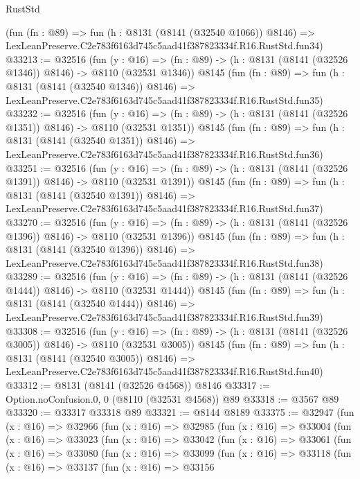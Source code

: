 \begin{lexlean}{RustStd}
\begin{coremodule}
    (fun (fn : @89) =>
    fun (h : @8131 (@8141 (@32540 @1066)) @8146) =>
    LexLeanPreserve.C2e783f6163d745c5aad41f387823334f.R16.RustStd.fun34)
@33213 := @32516
    (fun (y : @16) =>
    (fn : @89) -> (h : @8131 (@8141 (@32526 @1346)) @8146) -> @8110 (@32531 @1346))
    @8145
    (fun (fn : @89) =>
    fun (h : @8131 (@8141 (@32540 @1346)) @8146) =>
    LexLeanPreserve.C2e783f6163d745c5aad41f387823334f.R16.RustStd.fun35)
@33232 := @32516
    (fun (y : @16) =>
    (fn : @89) -> (h : @8131 (@8141 (@32526 @1351)) @8146) -> @8110 (@32531 @1351))
    @8145
    (fun (fn : @89) =>
    fun (h : @8131 (@8141 (@32540 @1351)) @8146) =>
    LexLeanPreserve.C2e783f6163d745c5aad41f387823334f.R16.RustStd.fun36)
@33251 := @32516
    (fun (y : @16) =>
    (fn : @89) -> (h : @8131 (@8141 (@32526 @1391)) @8146) -> @8110 (@32531 @1391))
    @8145
    (fun (fn : @89) =>
    fun (h : @8131 (@8141 (@32540 @1391)) @8146) =>
    LexLeanPreserve.C2e783f6163d745c5aad41f387823334f.R16.RustStd.fun37)
@33270 := @32516
    (fun (y : @16) =>
    (fn : @89) -> (h : @8131 (@8141 (@32526 @1396)) @8146) -> @8110 (@32531 @1396))
    @8145
    (fun (fn : @89) =>
    fun (h : @8131 (@8141 (@32540 @1396)) @8146) =>
    LexLeanPreserve.C2e783f6163d745c5aad41f387823334f.R16.RustStd.fun38)
@33289 := @32516
    (fun (y : @16) =>
    (fn : @89) -> (h : @8131 (@8141 (@32526 @1444)) @8146) -> @8110 (@32531 @1444))
    @8145
    (fun (fn : @89) =>
    fun (h : @8131 (@8141 (@32540 @1444)) @8146) =>
    LexLeanPreserve.C2e783f6163d745c5aad41f387823334f.R16.RustStd.fun39)
@33308 := @32516
    (fun (y : @16) =>
    (fn : @89) -> (h : @8131 (@8141 (@32526 @3005)) @8146) -> @8110 (@32531 @3005))
    @8145
    (fun (fn : @89) =>
    fun (h : @8131 (@8141 (@32540 @3005)) @8146) =>
    LexLeanPreserve.C2e783f6163d745c5aad41f387823334f.R16.RustStd.fun40)
@33312 := @8131 (@8141 (@32526 @4568)) @8146
@33317 := Option.noConfusion.{0, 0} (@8110 (@32531 @4568)) @89
@33318 := @3567 @89
@33320 := @33317 @33318 @89
@33321 := @8144 @8189
@33375 := @32947
    (fun (x : @16) =>
    @32966
      (fun (x : @16) =>
      @32985
        (fun (x : @16) =>
        @33004
          (fun (x : @16) =>
          @33023
            (fun (x : @16) =>
            @33042
              (fun (x : @16) =>
              @33061
                (fun (x : @16) =>
                @33080
                  (fun (x : @16) =>
                  @33099
                    (fun (x : @16) =>
                    @33118
                      (fun (x : @16) =>
                      @33137
                        (fun (x : @16) =>
                        @33156

\end{coremodule}
\end{lexlean}
